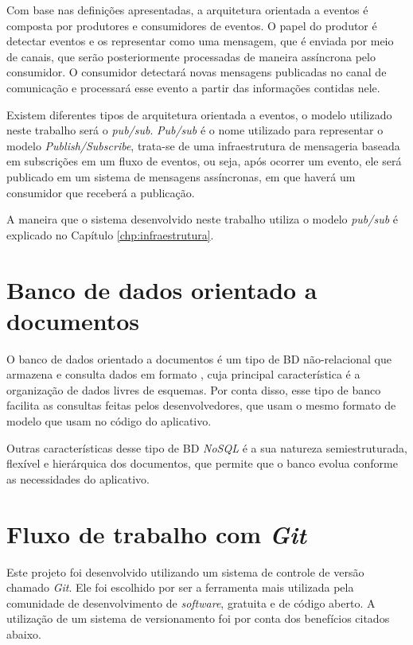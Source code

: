 Com base nas definições apresentadas, a arquitetura orientada a eventos é composta por produtores e consumidores de eventos. O papel do produtor é detectar eventos e os representar como uma mensagem, que é enviada por meio de canais, que serão posteriormente processadas de maneira assíncrona pelo consumidor. O consumidor detectará novas mensagens publicadas no canal de comunicação e processará esse evento a partir das informações contidas nele. 

Existem diferentes tipos de arquitetura orientada a eventos, o modelo utilizado neste trabalho será o \textit{pub/sub}. \textit{Pub/sub} é o nome utilizado para representar o modelo \textit{Publish/Subscribe}, trata-se de uma infraestrutura de mensageria baseada em subscrições em um fluxo de eventos, ou seja, após ocorrer um evento, ele será publicado em um sistema de mensagens assíncronas, em que haverá um consumidor que receberá a publicação.

A maneira que o sistema desenvolvido neste trabalho utiliza o modelo \textit{pub/sub} é explicado no Capítulo \ref{chp:infraestrutura}.

\section{Banco de dados orientado a documentos}\label{sec:bd}
O banco de dados orientado a documentos é um tipo de BD não-relacional que armazena e consulta dados em formato , cuja principal característica é a organização de dados livres de esquemas. Por conta disso, esse tipo de banco facilita as consultas feitas pelos desenvolvedores, que usam o mesmo formato de modelo que usam no código do aplicativo.

Outras características desse tipo de BD \textit{NoSQL} é a sua natureza semiestruturada, flexível e hierárquica dos documentos, que permite que o banco evolua conforme as necessidades do aplicativo.

\section{Fluxo de trabalho com \textit{Git}}\label{sec:Git}
Este projeto foi desenvolvido utilizando um sistema de controle de versão chamado \textit{Git}. Ele foi escolhido por ser a ferramenta mais utilizada pela comunidade de desenvolvimento de \textit{software}, gratuita e de código aberto. A utilização de um sistema de versionamento foi por conta dos benefícios citados abaixo.

